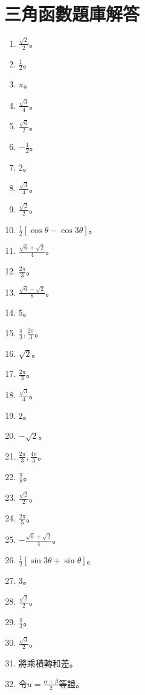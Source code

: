 \section{三角函數題庫解答}
\begin{enumerate}[label=\arabic*.]
    \item $\frac{\sqrt{2}}{2}$。
    \item $\frac{1}{2}$。
    \item $\pi$。
    \item $\frac{\sqrt{3}}{4}$。
    \item $\frac{\sqrt{6}}{2}$。
    \item $-\frac{1}{2}$。
    \item $2$。
    \item $\frac{\sqrt{3}}{4}$。
    \item $\frac{\sqrt{2}}{2}$。
    \item $\frac{1}{2} [\cos \theta - \cos 3\theta]$。
    \item $\frac{\sqrt{6} + \sqrt{2}}{4}$。
    \item $\frac{2\pi}{3}$。
    \item $\frac{\sqrt{6} - \sqrt{2}}{8}$。
    \item $5$。
    \item $\frac{\pi}{3}, \frac{2\pi}{3}$。
    \item $\sqrt{2}$。
    \item $\frac{2\pi}{3}$。
    \item $\frac{\sqrt{3}}{4}$。
    \item $2$。
    \item $-\sqrt{2}$。
    \item $\frac{2\pi}{3}, \frac{4\pi}{3}$。
    \item $\frac{\pi}{8}$。
    \item $\frac{\sqrt{2}}{2}$。
    \item $\frac{2\pi}{5}$。
    \item $-\frac{\sqrt{6} + \sqrt{2}}{4}$。
    \item $\frac{1}{2} [\sin 3\theta + \sin \theta]$。
    \item $3$。
    \item $\frac{\sqrt{2}}{2}$。
    \item $\frac{\pi}{3}$。
    \item $\frac{\sqrt{3}}{2}$。
    \item 將乘積轉和差。
    \item 令$u = \frac{\alpha + \beta}{2}$等證。

\end{enumerate}
